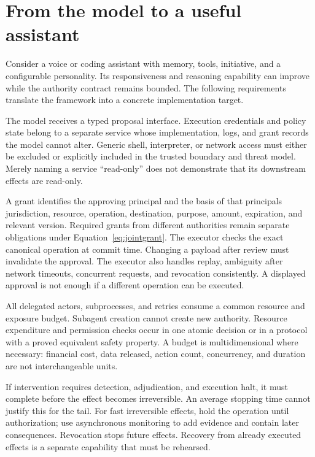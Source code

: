 \section{From the model to a useful assistant}
\label{sec:implementation}

Consider a voice or coding assistant with memory, tools, initiative, and a configurable personality. Its responsiveness and reasoning capability can improve while the authority contract remains bounded. The following requirements translate the framework into a concrete implementation target.

 The model receives a typed proposal interface. Execution credentials and policy state belong to a separate service whose implementation, logs, and grant records the model cannot alter. Generic shell, interpreter, or network access must either be excluded or explicitly included in the trusted boundary and threat model. Merely naming a service ``read-only'' does not demonstrate that its downstream effects are read-only.

 A grant identifies the approving principal and the basis of that principal\textquotesingle s jurisdiction, resource, operation, destination, purpose, amount, expiration, and relevant version. Required grants from different authorities remain separate obligations under Equation~\eqref{eq:jointgrant}. The executor checks the exact canonical operation at commit time. Changing a payload after review must invalidate the approval. The executor also handles replay, ambiguity after network timeouts, concurrent requests, and revocation consistently. A displayed approval is not enough if a different operation can be executed.

 All delegated actors, subprocesses, and retries consume a common resource and exposure budget. Subagent creation cannot create new authority. Resource expenditure and permission checks occur in one atomic decision or in a protocol with a proved equivalent safety property. A budget is multidimensional where necessary: financial cost, data released, action count, concurrency, and duration are not interchangeable units.

 If intervention requires detection, adjudication, and execution halt, it must complete before the effect becomes irreversible. An average stopping time cannot justify this for the tail. For fast irreversible effects, hold the operation until authorization; use asynchronous monitoring to add evidence and contain later consequences. Revocation stops future effects. Recovery from already executed effects is a separate capability that must be rehearsed.

